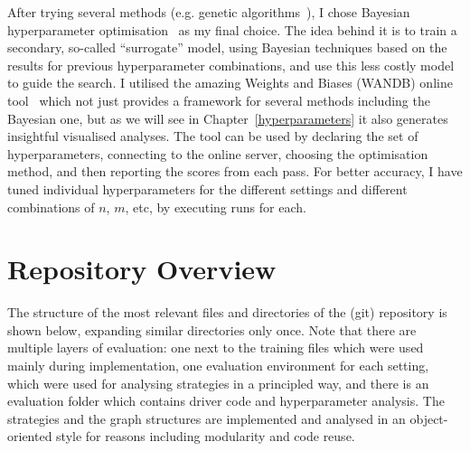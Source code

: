 After trying several methods (e.g. genetic algorithms~\cite{wicaksono2018genetichyper}), I chose Bayesian hyperparameter optimisation~\cite{eggensperger2013bayesianhyper} as my final choice. The idea behind it is to train a secondary, so-called ``surrogate'' model, using Bayesian techniques based on the results for previous hyperparameter combinations, and use this less costly model to guide the search. I utilised the amazing Weights and Biases (WANDB) online tool~\cite{biewald2020wandb} which not just provides a framework for several methods including the Bayesian one, but as we will see in Chapter~\ref{hyperparameters} it also generates insightful visualised analyses. The tool can be used by declaring the set of hyperparameters, connecting to the online server, choosing the optimisation method, and then reporting the scores from each pass. For better accuracy, I have tuned individual hyperparameters for the different settings and different combinations of $n$, $m$, etc, by executing \NumberofHyperparameterIterations runs for each.

\section{Repository Overview}

The structure of the most relevant files and directories of the (git) repository is shown below, expanding similar directories only once. Note that there are multiple layers of evaluation: one next to the training files which were used mainly during implementation, one evaluation environment for each setting, which were used for analysing strategies in a principled way, and there is an evaluation folder which contains driver code and hyperparameter analysis. The strategies and the graph structures are implemented and analysed in an object-oriented style for reasons including modularity and code reuse.



